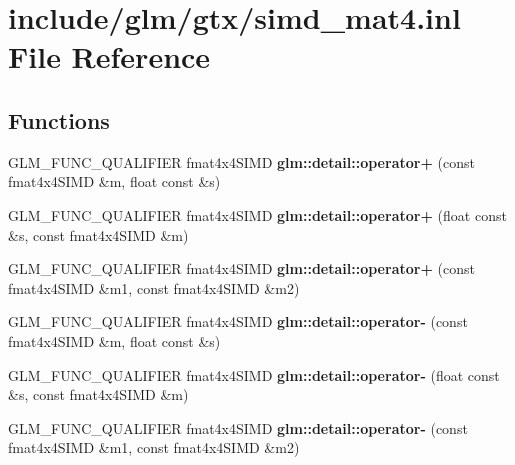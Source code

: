 \hypertarget{simd__mat4_8inl}{}\section{include/glm/gtx/simd\+\_\+mat4.inl File Reference}
\label{simd__mat4_8inl}
\subsection*{Functions}
\begin{DoxyCompactItemize}
\item 
\mbox{\label{simd__mat4_8inl_a629935a47dc01b2cd4aa5598f364e359}} 
G\+L\+M\+\_\+\+F\+U\+N\+C\+\_\+\+Q\+U\+A\+L\+I\+F\+I\+ER fmat4x4\+S\+I\+MD {\bfseries glm\+::detail\+::operator+} (const fmat4x4\+S\+I\+MD \&m, float const \&s)
\item 
\mbox{\label{simd__mat4_8inl_a4b632f8b13f05642eea7d551815f0923}} 
G\+L\+M\+\_\+\+F\+U\+N\+C\+\_\+\+Q\+U\+A\+L\+I\+F\+I\+ER fmat4x4\+S\+I\+MD {\bfseries glm\+::detail\+::operator+} (float const \&s, const fmat4x4\+S\+I\+MD \&m)
\item 
\mbox{\label{simd__mat4_8inl_a9f20d29252cc62031ba3b05aff1d2fe8}} 
G\+L\+M\+\_\+\+F\+U\+N\+C\+\_\+\+Q\+U\+A\+L\+I\+F\+I\+ER fmat4x4\+S\+I\+MD {\bfseries glm\+::detail\+::operator+} (const fmat4x4\+S\+I\+MD \&m1, const fmat4x4\+S\+I\+MD \&m2)
\item 
\mbox{\label{simd__mat4_8inl_aab9939909f4d23c042e7d438dda5caca}} 
G\+L\+M\+\_\+\+F\+U\+N\+C\+\_\+\+Q\+U\+A\+L\+I\+F\+I\+ER fmat4x4\+S\+I\+MD {\bfseries glm\+::detail\+::operator-\/} (const fmat4x4\+S\+I\+MD \&m, float const \&s)
\item 
\mbox{\label{simd__mat4_8inl_a470e32d5d0337f7714ecb8c8c9ad368d}} 
G\+L\+M\+\_\+\+F\+U\+N\+C\+\_\+\+Q\+U\+A\+L\+I\+F\+I\+ER fmat4x4\+S\+I\+MD {\bfseries glm\+::detail\+::operator-\/} (float const \&s, const fmat4x4\+S\+I\+MD \&m)
\item 
\mbox{\label{simd__mat4_8inl_a00972f91f088e7ab0f96ebdc6e8bec41}} 
G\+L\+M\+\_\+\+F\+U\+N\+C\+\_\+\+Q\+U\+A\+L\+I\+F\+I\+ER fmat4x4\+S\+I\+MD {\bfseries glm\+::detail\+::operator-\/} (const fmat4x4\+S\+I\+MD \&m1, const fmat4x4\+S\+I\+MD \&m2)

\end{DoxyCompactItemize}
